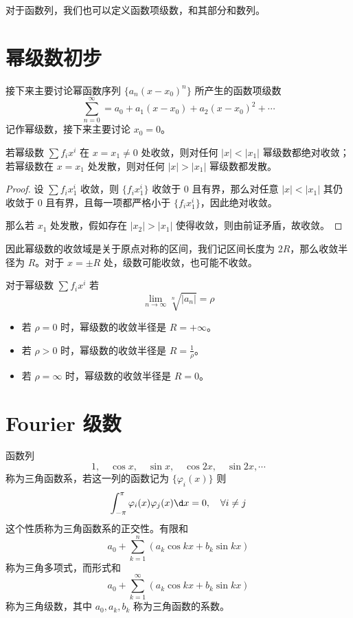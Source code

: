 对于函数列，我们也可以定义函数项级数，和其部分和数列。

\section{幂级数初步}

接下来主要讨论幂函数序列 $\{a_n(x- x_0)^n \}$ 所产生的函数项级数
\[ \sum_{n=0}^{\infty} = a_0 + a_1(x-x_0) + a_2(x-x_0)^2 + \cdots \]
记作幂级数，接下来主要讨论 $x_0 = 0$。

\begin{theorem}
	若幂级数 $\sum f_i x^i$ 在 $x = x_1 \neq 0$ 处收敛，则对任何 $|x| < |x_1|$ 幂级数都绝对收敛；若幂级数在 $x = x_1$ 处发散，则对任何 $|x| > |x_1|$ 幂级数都发散。
\end{theorem}

\begin{proof}
	设 $\sum f_i x_1^i$ 收敛，则 $\{f_i x_1^i\}$ 收敛于 $0$ 且有界，那么对任意 $|x| < |x_1|$ 其仍收敛于 $0$ 且有界，且每一项都严格小于 $\{f_i x_1^i\}$，因此绝对收敛。
	
	那么若 $x_1$ 处发散，假如存在 $|x_2| > |x_1|$ 使得收敛，则由前证矛盾，故收敛。
\end{proof}

因此幂级数的收敛域是关于原点对称的区间，我们记区间长度为 $2R$，那么收敛半径为 $R$。对于 $x = \pm R$ 处，级数可能收敛，也可能不收敛。

\begin{theorem}
	对于幂级数 $\sum f_i x^i$ 若
	\[ \lim_{n \to \infty} \sqrt[n]{|a_n|} = \rho \]
	\begin{itemize}
		\item 若 $\rho = 0$ 时，幂级数的收敛半径是 $R = +\infty$。
		\item 若 $\rho > 0$ 时，幂级数的收敛半径是 $R = \frac{1}{\rho}$。
		\item 若 $\rho = \infty$ 时，幂级数的收敛半径是 $R = 0$。
	\end{itemize}
\end{theorem}

\section{Fourier 级数}

函数列
\[ 1, \quad \cos x, \quad \sin x, \quad \cos 2x, \quad \sin 2x , \cdots \]
称为三角函数系，若这一列的函数记为 $\{\varphi_i(x)\}$ 则
\[ \int_{-\pi}^{\pi} \varphi_i(x) \varphi_j(x) \d x = 0, \quad \forall i \neq j \]
这个性质称为三角函数系的正交性。有限和
\[ a_0 + \sum_{k=1}^n (a_k \cos kx + b_k \sin kx) \]
称为三角多项式，而形式和
\[ a_0 + \sum_{k=1}^\infty (a_k \cos kx + b_k \sin kx) \]
称为三角级数，其中 $a_0, a_k, b_k$ 称为三角函数的系数。

